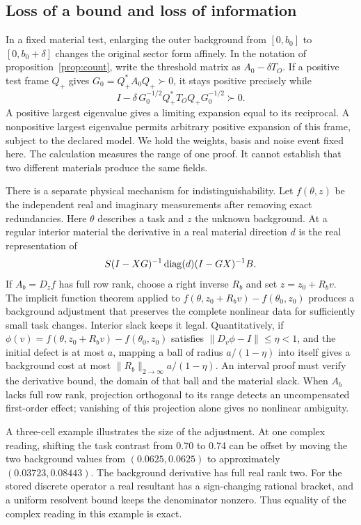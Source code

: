 \subsection{Loss of a bound and loss of information}
In a fixed material test, enlarging the outer background from $[0,b_0]$ to $[0,b_0+\delta]$ changes the original sector form affinely. In the notation of proposition~\ref{prop:count}, write the threshold matrix as $A_0-\delta T_O$. If a positive test frame $Q_+$ gives $G_0=Q_+^*A_0Q_+\succ0$, it stays positive precisely while
\begin{equation}
 I-\delta\,G_0^{-1/2}Q_+^*T_OQ_+G_0^{-1/2}\succ0 .
 \label{eq:toler}
\end{equation}
A positive largest eigenvalue gives a limiting expansion equal to its reciprocal. A nonpositive largest eigenvalue permits arbitrary positive expansion of this frame, subject to the declared model. We hold the weights, basis and noise event fixed here. The calculation measures the range of one proof. It cannot establish that two different materials produce the same fields.

There is a separate physical mechanism for indistinguishability. Let $f(\theta,z)$ be the independent real and imaginary measurements after removing exact redundancies. Here $\theta$ describes a task and $z$ the unknown background. At a regular interior material the derivative in a real material direction $d$ is the real representation of
\begin{equation}
 S(I-XG)^{-1}\operatorname{diag}(d)(I-GX)^{-1}B .
 \label{eq:deriv}
\end{equation}
If $A_b=D_zf$ has full row rank, choose a right inverse $R_b$ and set $z=z_0+R_b v$. The implicit function theorem applied to $f(\theta,z_0+R_bv)-f(\theta_0,z_0)$ produces a background adjustment that preserves the complete nonlinear data for sufficiently small task changes. Interior slack keeps it legal. Quantitatively, if $\phi(v)=f(\theta,z_0+R_bv)-f(\theta_0,z_0)$ satisfies $\|D_v\phi-I\|\le\eta<1$, and the initial defect is at most $a$, mapping a ball of radius $a/(1-\eta)$ into itself gives a background cost at most $\|R_b\|_{2\to\infty}a/(1-\eta)$. An interval proof must verify the derivative bound, the domain of that ball and the material slack. When $A_b$ lacks full row rank, projection orthogonal to its range detects an uncompensated first-order effect; vanishing of this projection alone gives no nonlinear ambiguity.

A three-cell example illustrates the size of the adjustment. At one complex reading, shifting the task contrast from 0.70 to 0.74 can be offset by moving the two background values from $(0.0625,0.0625)$ to approximately $(0.03723,0.08443)$. The background derivative has full real rank two. For the stored discrete operator a real resultant has a sign-changing rational bracket, and a uniform resolvent bound keeps the denominator nonzero. Thus equality of the complex reading in this example is exact.

